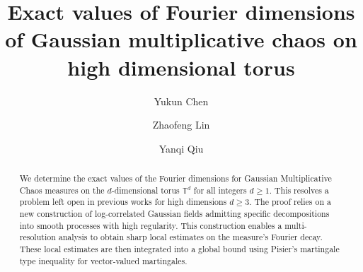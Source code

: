 \documentclass[12pt]{amsart}
\theoremstyle{definition}
\theoremstyle{remark}
\newcommand{\T}{\mathbb{T}}
\numberwithin{equation}{section}
\begin{document}
	\title[Fourier dimension of GMC on high dimensional torus]{Exact values of Fourier dimensions of Gaussian multiplicative chaos on high dimensional torus}
	
	
	\author
	{Yukun Chen}
	\address
	{Yukun Chen: School of Mathematics and Statistics, Wuhan University, Wuhan 430072, China}
	
	\author
	{Zhaofeng Lin}
	\address
	{Zhaofeng LIN: School of Fundamental Physics and Mathematical Sciences, HIAS, University of Chinese Academy of Sciences, Hangzhou 310024, China}
	
	\author%
	{Yanqi Qiu}
	\address%
	{Yanqi QIU: School of Fundamental Physics and Mathematical Sciences, HIAS, University of Chinese Academy of Sciences, Hangzhou 310024, China}
	
	
	
	
	
\begin{abstract}
We determine the exact values of the Fourier dimensions for Gaussian Multiplicative Chaos measures on the $d$-dimensional torus $\T^d$ for all integers $d \ge 1$. This resolves a problem left open in previous works \cite{LQT24,LQT25} for  high dimensions $d\ge 3$. The proof relies on a new construction of log-correlated Gaussian fields admitting specific decompositions into smooth processes with high regularity. This construction enables a multi-resolution analysis to obtain sharp local estimates on the measure's Fourier decay. These local estimates are then integrated into a global bound using Pisier's martingale type inequality for vector-valued martingales.
\end{abstract}
	
	
	
	
	\maketitle
	\tableofcontents
	
	
	\setcounter{tocdepth}{2}
	
\end{document}
